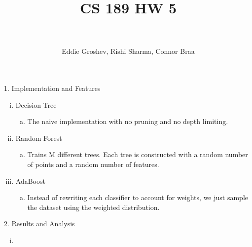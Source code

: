 \documentclass[paper=a4, fontsize=11pt]{scrartcl} %
\title{	
\normalfont \normalsize 
\horrule{0.5pt} \\[0.4cm] %
\huge CS 189 HW 5 \\ %
\horrule{2pt} \\[-0.1cm] %
}
\author{Eddie Groshev, Rishi Sharma, Connor Braa}
\numberwithin{equation}{section} %
\numberwithin{figure}{section} %
\numberwithin{table}{section} %
\begin{document}
	
\maketitle %


{\Large 1. \indent Implementation and Features}
\\
\begin{enumerate}[(i)]

\item Decision Tree
\begin{enumerate}[(a)]
\item The naive implementation with no pruning and no depth limiting.
\end{enumerate}

\item Random Forest
\begin{enumerate}[(a)]
\item Trains M different trees. Each tree is constructed with a random number of points and a random number of features.
\end{enumerate}

\item AdaBoost
\begin{enumerate}[(a)]
\item Instead of rewriting each classifier to account for weights, we just sample the dataset using the weighted distribution.
\end{enumerate}

\end{enumerate}

\newpage %
 {\Large 2. \indent Results and Analysis}
\\

\begin{enumerate}[(i)]
\item
\end{enumerate}
\end{document}
